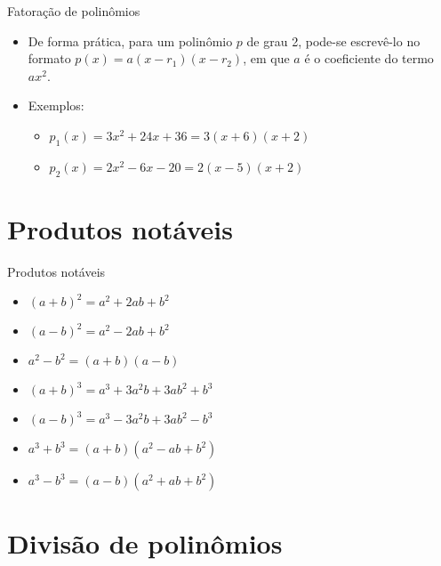 \documentclass[14pt, aspectratio=169]{beamer}
\newcommand{\skipframe}{\vspace{10.0cm}}
\begin{document}
\begin{frame}[allowframebreaks]{Fatoração de polinômios}
\begin{itemize}
    \skipframe

    \item De forma prática, para um polinômio $p$ de grau 2, pode-se escrevê-lo no formato $p(x) = a(x - r_1)(x - r_2)$, em que $a$ é o coeficiente do termo $ax^2$.

    \item Exemplos:
    \begin{itemize}
        \item $p_1(x) = 3x^2 + 24x + 36 = 3(x + 6)(x + 2)$
        \item $p_2(x) = 2x^2 - 6x - 20 = 2(x - 5)(x + 2)$
    \end{itemize}

\end{itemize}
    
\end{frame}

\section{Produtos notáveis}

\begin{frame}{Produtos notáveis}

\begin{itemize}
    \item $(a + b)^2 = a^2 + 2ab + b^2$
    \item $(a - b)^2 = a^2 - 2ab + b^2$
    \item $a^2 - b^2 = (a + b)(a - b)$
    \item $(a + b)^3 = a^3 + 3a^2b + 3ab^2 + b^3$
    \item $(a - b)^3 = a^3 - 3a^2b + 3ab^2 - b^3$
    \item $a^3 + b^3 = (a + b)(a^2 - ab + b^2)$
    \item $a^3 - b^3 = (a - b)(a^2 + ab + b^2)$
\end{itemize}
    
\end{frame}

\section{Divisão de polinômios}
\end{document}
